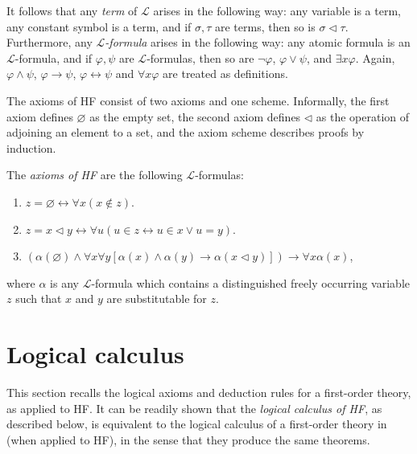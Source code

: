 It follows that any \textit{term} of $\mathcal{L}$ arises in the following way:
any variable is a term, any constant symbol is a term, and if $\sigma, \tau$ are terms, then so is
$\sigma \lhd \tau$.
Furthermore, any \textit{$\mathcal{L}$-formula} arises in the following way:
any atomic formula is an $\mathcal{L}$-formula, and if $\varphi, \psi$ are $\mathcal{L}$-formulas, 
then so are $\neg \varphi$, $\varphi \lor \psi$, and $\exists x \varphi$.
Again, $\varphi \land \psi$, $\varphi \rightarrow \psi$, $\varphi \leftrightarrow \psi$ and
$\forall x \varphi$ are treated as definitions.

The axioms of HF consist of two axioms and one scheme. 
Informally, the first axiom defines $\varnothing$ as the
empty set, the second axiom defines $\lhd$ as the operation of adjoining an element to a set,
and the axiom scheme describes proofs by induction.

\begin{definition}
    \label{def:Axioms}
    \leanok
    The \textit{axioms of HF} are the following $\mathcal{L}$-formulas:
    \begin{enumerate}
        \item $z=\varnothing \leftrightarrow \forall x(x \notin z)$.
        \item $z=x \lhd y \leftrightarrow \forall u(u \in z \leftrightarrow u \in x \lor u=y)$.
        \item $(\alpha(\varnothing) \land \forall x \forall y[\alpha(x) \land \alpha(y) \rightarrow 
        \alpha(x \lhd y)]) \rightarrow \forall x \alpha(x)$,
    \end{enumerate}
    where $\alpha$ is any $\mathcal{L}$-formula which contains a 
    distinguished freely occurring variable $z$ such that $x$ and $y$ are substitutable for $z$.
\end{definition}

\section{Logical calculus}

This section recalls the logical axioms and deduction rules for a first-order theory, 
as applied to HF. 
It can be readily shown that the \textit{logical calculus of HF}, as described below, 
is equivalent to the logical calculus of a first-order theory in \cite{shoenfield1967mathematical} 
(when applied to HF), in the sense that they produce the same theorems.

